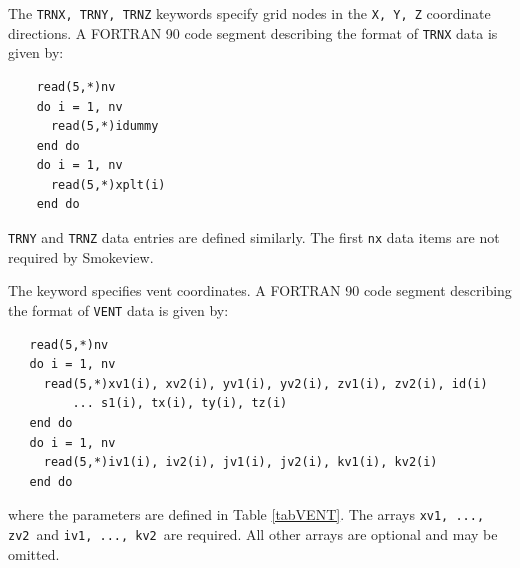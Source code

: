 \documentclass[11pt,twoside]{book}
\newcommand{\smokeview}{{Smokeview}}
\newcommand{\hitem}[1]{\item[{\bf #1} \hfill]}
\begin{document}
\hitem{TRNX,TRNY,TRNZ}The {\tt TRNX, TRNY, TRNZ} keywords specify
grid nodes in the {\tt X, Y, Z} coordinate directions.  A FORTRAN
90 code segment describing the format of {\tt TRNX} data is given
by:
\begin{verbatim}
    read(5,*)nv
    do i = 1, nv
      read(5,*)idummy
    end do
    do i = 1, nv
      read(5,*)xplt(i)
    end do
\end{verbatim}
{\tt TRNY} and {\tt TRNZ} data entries are defined similarly. The first {\tt nx} data items
are not required by \smokeview.

\hitem{VENT}The keyword specifies vent coordinates.
A FORTRAN 90 code segment describing the format of {\tt VENT} data is given by:
\begin{verbatim}
   read(5,*)nv
   do i = 1, nv
     read(5,*)xv1(i), xv2(i), yv1(i), yv2(i), zv1(i), zv2(i), id(i)
         ... s1(i), tx(i), ty(i), tz(i)
   end do
   do i = 1, nv
     read(5,*)iv1(i), iv2(i), jv1(i), jv2(i), kv1(i), kv2(i)
   end do
\end{verbatim}
where the parameters are defined in Table \ref{tabVENT}.  The arrays {\tt xv1,  ..., zv2}\ and {\tt iv1, ..., kv2}\ are
required. All other arrays are optional and may be omitted.
\end{document}
